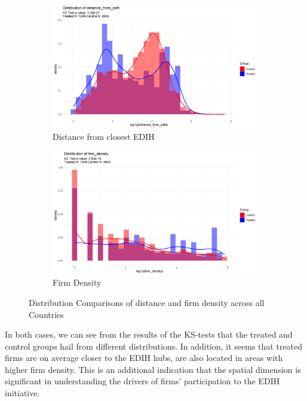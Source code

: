 \documentclass[12pt]{report}
\begin{document}
\begin{figure}[ht]
    \centering
    \begin{subfigure}[b]{0.45\textwidth}
        \centering
        \includegraphics[width=\linewidth]{../Output/distrib_compare_distance_from_edih_allcountries.png}
        \caption{Distance from closest EDIH}
        \label{fig:distance_from_edih}
    \end{subfigure}
    \hfill
    \begin{subfigure}[b]{0.45\textwidth}
        \centering
        \includegraphics[width=\linewidth]{../Output/distrib_compare_firm_density_allcountries.png}
        \caption{Firm Density}
        \label{fig:firm_density}
    \end{subfigure}
    \caption{Distribution Comparisons of distance and firm density across all Countries}
    \label{fig:distribution_comparisons}
\end{figure}

\par In both cases, we can see from the results of the KS-tests that the treated and control groups hail from different distributions. In addition, it seems that treated firms are on average closer to the EDIH hubs, are also located in areas with higher firm density. This is an additional indication that the spatial dimension is significant in understanding the drivers of firms' participation to the EDIH initiative.
\end{document}
